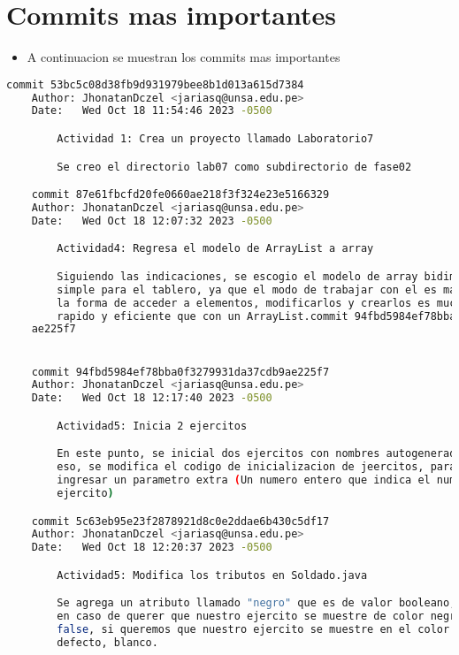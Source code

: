 \section{Commits mas importantes}
\begin{itemize}
  \item A continuacion se muestran los commits mas importantes
\end{itemize}


    \begin{lstlisting}[language=bash, caption={commits mas importantes}]
    commit 53bc5c08d38fb9d931979bee8b1d013a615d7384
    Author: JhonatanDczel <jariasq@unsa.edu.pe>
    Date:   Wed Oct 18 11:54:46 2023 -0500

        Actividad 1: Crea un proyecto llamado Laboratorio7

        Se creo el directorio lab07 como subdirectorio de fase02

    commit 87e61fbcfd20fe0660ae218f3f324e23e5166329
    Author: JhonatanDczel <jariasq@unsa.edu.pe>
    Date:   Wed Oct 18 12:07:32 2023 -0500

        Actividad4: Regresa el modelo de ArrayList a array

        Siguiendo las indicaciones, se escogio el modelo de array bidimensional
        simple para el tablero, ya que el modo de trabajar con el es mas simple,
        la forma de acceder a elementos, modificarlos y crearlos es mucho mas
        rapido y eficiente que con un ArrayList.commit 94fbd5984ef78bba0f3279931da37cdb9
    ae225f7


    commit 94fbd5984ef78bba0f3279931da37cdb9ae225f7
    Author: JhonatanDczel <jariasq@unsa.edu.pe>
    Date:   Wed Oct 18 12:17:40 2023 -0500

        Actividad5: Inicia 2 ejercitos

        En este punto, se inicial dos ejercitos con nombres autogenerados, para
        eso, se modifica el codigo de inicializacion de jeercitos, para permitir
        ingresar un parametro extra (Un numero entero que indica el numero de
        ejercito)

    commit 5c63eb95e23f2878921d8c0e2ddae6b430c5df17
    Author: JhonatanDczel <jariasq@unsa.edu.pe>
    Date:   Wed Oct 18 12:20:37 2023 -0500

        Actividad5: Modifica los tributos en Soldado.java

        Se agrega un atributo llamado "negro" que es de valor booleano, es true
        en caso de querer que nuestro ejercito se muestre de color negro, y
        false, si queremos que nuestro ejercito se muestre en el color por
        defecto, blanco.


\end{lstlisting}
